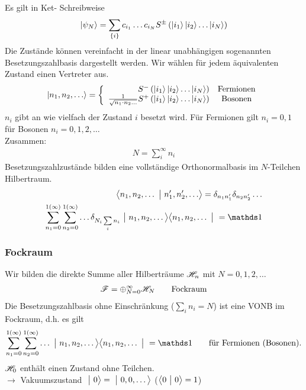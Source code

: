 Es gilt in Ket- Schreibweise
\begin{eqnarray*} \left | \psi_N \right > = \sum \limits_{\{i\}} c_{i_1} \dots c_{i_N} S^\pm \left ( \left | i_1 \right > \left | i_2 \right > \dots \left | i_N \right > \right)
\end{eqnarray*}
Die Zustände können vereinfacht in der linear unabhängigen sogenannten Besetzungszahlbasis dargestellt werden.
Wir wählen für jedem äquivalenten Zustand einen Vertreter aus.
\begin{eqnarray*} \left |n_1,n_2, \dots \ro = \left \{ \begin{array}{rc} S^- \left(\left| i_1 \ro \left | i_2 \ro \dots \left | i_N\ro \ri)&\text{Fermionen} \\ \frac 1 {\sqrt{n_1 \cdot n_2 \dots}} S^+ \left(\left| i_1 \ro \left | i_2 \ro \dots \left | i_N\ro \ri)&\text{Bosonen}\end{array}\ri.
\end{eqnarray*}
$n_i$ gibt an wie vielfach der Zustand $i$ besetzt wird. Für Fermionen gilt $n_i = 0,1$ für Bosonen $n_i = 0,1,2,\dots$\\
Zusammen:
\begin{eqnarray*} N = \sum \limits _i ^\infty n_i\end{eqnarray*}
Besetzungszahlzustände bilden eine vollständige Orthonormalbasis im $N$-Teilchen Hilbertraum.
\begin{eqnarray*}
\lo n_1,n_2,\dots \s n'_1,n'_2,\dots \ro = \delta_{n_1n'_1}\delta_{n_2n'_2}\dots\\
\sum \limits_{n_1 = 0}^{1(\infty)}\sum \limits_{n_2 = 0}^{1(\infty)}\dots \delta_{N_i \sum \limits _i n_i }\s n_1, n_2,\dots\big>\big< n_1,n_2,\dots\s = \mathds 1
\end{eqnarray*}


\subsubsection{Fockraum}
Wir bilden die direkte Summe aller Hilberträume $\mathscr H_n$ mit $N=0,1,2,\dots$
\begin{eqnarray*}
\mathscr F = {\oplus}  _{N = 0}^\infty \mathscr H_N\qquad \text{Fockraum}
\end{eqnarray*}
Die Besetzungszahlbasis ohne Einschränkung ($\sum \limits_i n_i = N$) ist eine VONB im Fockraum, d.h. es gilt
\begin{eqnarray*}
\sum \limits _{n_1 = 0}^{1 (\infty)} \sum \limits _{n_2 = 0}^{1 (\infty)}\dots \s n_1,n_2,\dots\big >\big<n_1,n_2,\dots\s=\mathds 1\qquad\text{für  Fermionen (Bosonen).}
\end{eqnarray*}
$\mathscr H_0$  enthält einen Zustand ohne Teilchen.\\
$\longrightarrow$ Vakuumszustand $\ \big| \  0 \big > = \ \big| \  0,0,\dots\big >$    \Big($\left <0\ \big| \ 0\right > = 1$\Big)



